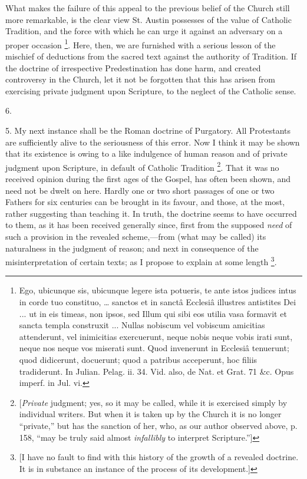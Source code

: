 What makes the failure of this appeal to the previous belief of the
Church still more remarkable, is the clear view St. Austin possesses
of the value of Catholic Tradition, and the force with which he can
urge it against an adversary on a proper occasion \footnote{Ego, ubicunque sis, ubicunque legere ista
potueris, te ante istos judices intus in corde tuo constituo, …
sanctos et in sanctâ Ecclesiâ illustres antistites Dei ... ut in eis
timeas, non ipsos, sed Illum qui sibi eos utilia vasa formavit et
sancta templa construxit ... Nullas nobiscum vel vobiscum amicitias
attenderunt, vel inimicitias exercuerunt, neque nobis neque vobis
irati sunt, neque nos neque vos miserati sunt. Quod invenerunt in
Ecclesiâ tenuerunt; quod didicerunt, docuerunt; quod a patribus
acceperunt, hoc filiis tradiderunt. In Julian. Pelag. ii. 34. Vid.
also, de Nat. et Grat. 71 \&c. Opus imperf. in Jul. vi.}. Here, then, we are furnished with a serious lesson of the
mischief of deductions from the sacred text against the authority of
Tradition. If the doctrine of irrespective Predestination has done
harm, and created controversy in the Church, let it not be forgotten
that this has arisen from exercising private judgment upon Scripture,
to the neglect of the Catholic sense.

6.

5. My next instance shall be the Roman doctrine of Purgatory. All
Protestants are sufficiently alive to the seriousness of this error.
Now I think it may be shown that its existence is owing to a like
indulgence of human reason and of private judgment upon Scripture, in
default of Catholic Tradition \footnote{[\emph{Private} judgment; yes, so it may be
called, while it is exercised simply by individual writers. But when
it is taken up by the Church it is no longer ``private,'' but
has the sanction of her, who, as our author observed above, p. 158,
``may be truly said almost \emph{infallibly} to interpret
Scripture.'']}.
That it was no received opinion during the first ages of the Gospel,
has often been shown, and need not be dwelt on here. Hardly one or two
short passages of one or two Fathers for six centuries can be brought
in its favour, and those, at the most, rather suggesting than teaching
it. In truth, the doctrine seems to have occurred to them, as it has
been received generally since, first from the supposed \emph{need} of such a
provision in the revealed scheme,—from (what may be called) its
naturalness in the judgment of reason; and next in consequence of the
misinterpretation of certain texts; as I propose to explain at some
length \footnote{[I have no fault to find with this history
of the growth of a revealed doctrine. It is in substance an instance
of the process of its development.]}.

